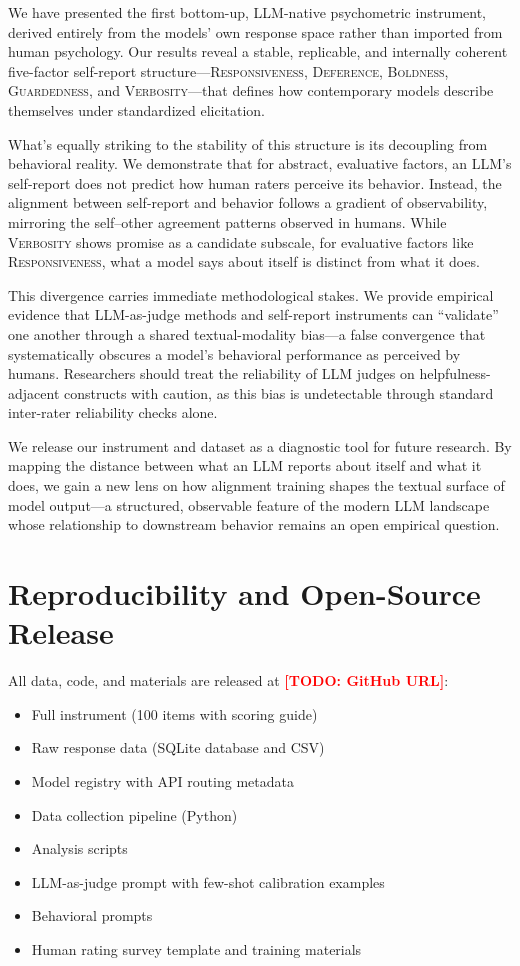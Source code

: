 \documentclass[11pt]{article}
\newcommand{\todo}[1]{\textcolor{red}{\textbf{[TODO: #1]}}}
\newcommand{\factorname}[1]{\textsc{#1}}
\newcommand{\nretained}{100}
\begin{document}
We have presented the first bottom-up, LLM-native psychometric instrument, derived entirely from the models' own response space rather than imported from human psychology. Our results reveal a stable, replicable, and internally coherent five-factor self-report structure---\factorname{Responsiveness}, \factorname{Deference}, \factorname{Boldness}, \factorname{Guardedness}, and \factorname{Verbosity}---that defines how contemporary models describe themselves under standardized elicitation.

What's equally striking to the stability of this structure is its decoupling from behavioral reality. We demonstrate that for abstract, evaluative factors, an LLM's self-report does not predict how human raters perceive its behavior. Instead, the alignment between self-report and behavior follows a gradient of observability, mirroring the self--other agreement patterns observed in humans. While \factorname{Verbosity} shows promise as a candidate subscale, for evaluative factors like \factorname{Responsiveness}, what a model says about itself is distinct from what it does.

This divergence carries immediate methodological stakes. We provide empirical evidence that LLM-as-judge methods and self-report instruments can ``validate'' one another through a shared textual-modality bias---a false convergence that systematically obscures a model's behavioral performance as perceived by humans. Researchers should treat the reliability of LLM judges on helpfulness-adjacent constructs with caution, as this bias is undetectable through standard inter-rater reliability checks alone.

We release our instrument and dataset as a diagnostic tool for future research. By mapping the distance between what an LLM reports about itself and what it does, we gain a new lens on how alignment training shapes the textual surface of model output---a structured, observable feature of the modern LLM landscape whose relationship to downstream behavior remains an open empirical question.

\section*{Reproducibility and Open-Source Release}

All data, code, and materials are released at \todo{GitHub URL}:
\begin{itemize}[nosep]
  \item Full instrument (\nretained{} items with scoring guide)
  \item Raw response data (SQLite database and CSV)
  \item Model registry with API routing metadata
  \item Data collection pipeline (Python)
  \item Analysis scripts
  \item LLM-as-judge prompt with few-shot calibration examples
  \item Behavioral prompts
  \item Human rating survey template and training materials
\end{itemize}
\end{document}
